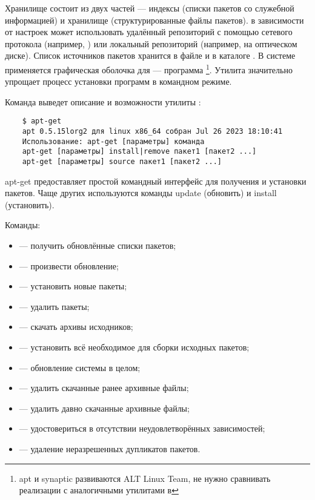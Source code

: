 Хранилище состоит из двух частей --- индексы (списки пакетов со служебной информацией) и
хранилище (структурированные файлы пакетов).
 в зависимости от настроек может использовать удалённый репозиторий
с помощью сетевого протокола (например, ) или локальный репозиторий (например,
на оптическом диске).
Список источников пакетов хранится в файле
 и в каталоге . В системе 
применяется графическая оболочка для  --- программа \footnote{apt и synaptic
	развиваются ALT Linux Team, не нужно сравнивать реализации с аналогичными утилитами в }.
Утилита  значительно упрощает процесс установки программ в командном режиме.


Команда  выведет описание и возможности утилиты :
\begin{verbatim}
	$ apt-get
	apt 0.5.15lorg2 для linux x86_64 собран Jul 26 2023 18:10:41
	Использование: apt-get [параметры] команда
	apt-get [параметры] install|remove пакет1 [пакет2 ...]
	apt-get [параметры] source пакет1 [пакет2 ...]
\end{verbatim}

apt-get предоставляет простой командный интерфейс для получения и
установки пакетов. Чаще других используются команды update (обновить)
и install (установить).
	
Команды:
\begin{itemize}
	\item {} --- получить обновлённые списки пакетов;
	\item {} --- произвести обновление;
	\item {} --- установить новые пакеты;
	\item {} --- удалить пакеты;
	\item {} --- скачать архивы исходников;
	\item {} --- установить всё необходимое для сборки исходных пакетов;
	\item {} --- обновление системы в целом;
	\item {} --- удалить скачанные ранее архивные файлы;
	\item {} --- удалить давно скачанные архивные файлы;
	\item {} --- удостовериться в отсутствии неудовлетворённых зависимостей;
	\item {} --- удаление неразрешенных дупликатов пакетов.
\end{itemize}
	

